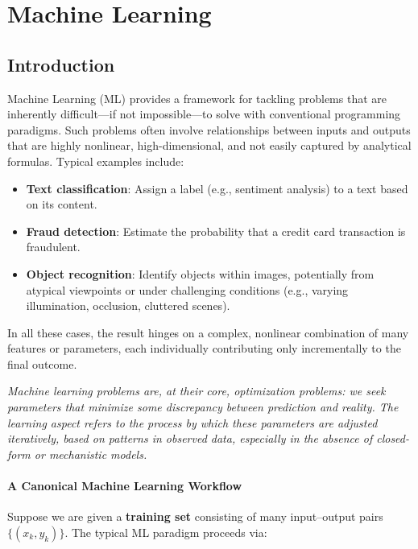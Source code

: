 \chapter{Machine Learning}

\section{Introduction}

Machine Learning (ML) provides a framework for tackling problems that are inherently difficult—if not impossible—to solve with conventional programming paradigms. Such problems often involve relationships between inputs and outputs that are highly nonlinear, high-dimensional, and not easily captured by analytical formulas. Typical examples include:

\begin{itemize}
    \item \textbf{Text classification}: Assign a label (e.g., sentiment analysis) to a text based on its content.
    \item \textbf{Fraud detection}: Estimate the probability that a credit card transaction is fraudulent.
    \item \textbf{Object recognition}: Identify objects within images, potentially from atypical viewpoints or under challenging conditions (e.g., varying illumination, occlusion, cluttered scenes).
\end{itemize}

In all these cases, the result hinges on a complex, nonlinear combination of many features or parameters, each individually contributing only incrementally to the final outcome.

\begin{observationblock}
    \textit{Machine learning problems are, at their core, optimization problems: we seek parameters that minimize some discrepancy between prediction and reality. The learning aspect refers to the process by which these parameters are adjusted iteratively, based on patterns in observed data, especially in the absence of closed-form or mechanistic models.}
\end{observationblock}

\subsubsection*{A Canonical Machine Learning Workflow}
Suppose we are given a \textbf{training set} consisting of many input--output pairs $\{(x_k, y_k)\}$. The typical ML paradigm proceeds via:

